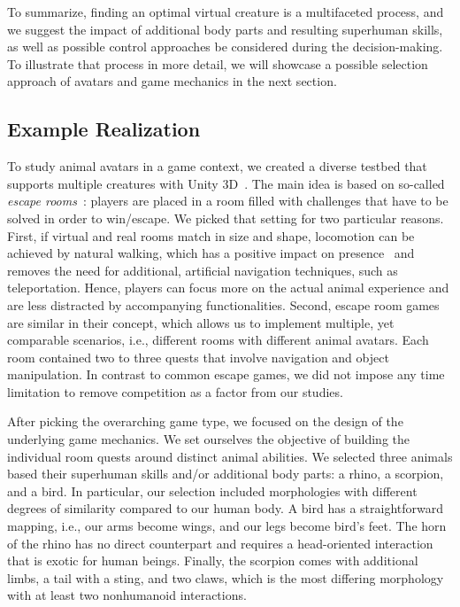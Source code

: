 \documentclass{sigchi}
\begin{document}
To summarize, finding an optimal virtual creature is a multifaceted process,
and we suggest the impact of additional body parts and resulting superhuman skills, as well as possible control approaches be considered during the decision-making. To illustrate that process in more detail, we will showcase a possible selection approach of avatars and game mechanics in the next section.








\subsection{Example Realization}

To study animal avatars in a game context, we created a diverse testbed that supports multiple creatures with Unity 3D~\cite{unity}. The main idea is based on so-called \textit{escape rooms}~\cite{wiemker2015escape}: players are placed in a room filled with challenges that have to be solved in order to win/escape. We picked that setting for two particular reasons. First, if virtual and real rooms match in size and shape, locomotion can be achieved by natural walking, which has a positive impact on presence~\cite{ruddle2009benefits,Krekhov:2018:GVRA} and removes the need for additional, artificial navigation techniques, such as teleportation. Hence, players can focus more on the actual animal experience and are less distracted by accompanying functionalities. Second, escape room games are similar in their concept, which allows us to implement multiple, yet comparable scenarios, i.e., different rooms with different animal avatars. Each room contained two to three quests that involve navigation and object manipulation. In contrast to common escape games, we did not impose any time limitation to remove competition as a factor from our studies.

After picking the overarching game type, we focused on the design of the underlying game mechanics. We set ourselves the objective of building the individual room quests around distinct animal abilities. We selected three animals based their superhuman skills and/or additional body parts: a rhino, a scorpion, and a bird. In particular, our selection included morphologies with different degrees of similarity compared to our human body. A bird has a straightforward mapping, i.e., our arms become wings, and our legs become bird's feet. The horn of the rhino has no direct counterpart and requires a head-oriented interaction that is exotic for human beings. Finally, the scorpion comes with additional limbs, a tail with a sting, and two claws, which is the most differing morphology with at least two nonhumanoid interactions.
\end{document}
